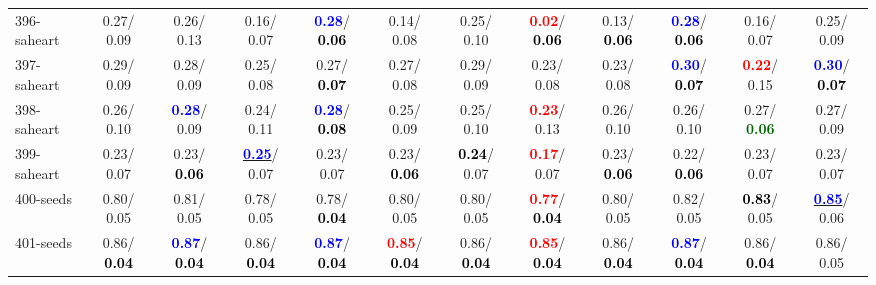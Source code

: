 \begin{table}[h]
\begin{center}
{\begin{tabular}{lc|c|c|c|c|c|c|c|c|c|c}
396-saheart &   0.27/  0.09 &   0.26/  0.13 &   0.16/  0.07 & \textcolor{blue}{\textbf{  0.28}}/\textcolor{black}{\textbf{  0.06}} &   0.14/  0.08 &   0.25/  0.10 & \textcolor{red}{\textbf{  0.02}}/\textcolor{black}{\textbf{  0.06}} &   0.13/\textcolor{black}{\textbf{  0.06}} & \textcolor{blue}{\textbf{  0.28}}/\textcolor{black}{\textbf{  0.06}} &   0.16/  0.07 &   0.25/  0.09 \\
397-saheart &   0.29/  0.09 &   0.28/  0.09 &   0.25/  0.08 &   0.27/\textcolor{black}{\textbf{  0.07}} &   0.27/  0.08 &   0.29/  0.09 &   0.23/  0.08 &   0.23/  0.08 & \textcolor{blue}{\textbf{  0.30}}/\textcolor{black}{\textbf{  0.07}} & \textcolor{red}{\textbf{  0.22}}/  0.15 & \textcolor{blue}{\textbf{  0.30}}/\textcolor{black}{\textbf{  0.07}} \\
398-saheart &   0.26/  0.10 & \textcolor{blue}{\textbf{  0.28}}/  0.09 &   0.24/  0.11 & \textcolor{blue}{\textbf{  0.28}}/\textcolor{black}{\textbf{  0.08}} &   0.25/  0.09 &   0.25/  0.10 & \textcolor{red}{\textbf{  0.23}}/  0.13 &   0.26/  0.10 &   0.26/  0.10 &   0.27/\textcolor{darkgreen}{\textbf{  0.06}} &   0.27/  0.09 \\ \hline
399-saheart &   0.23/  0.07 &   0.23/\textcolor{black}{\textbf{  0.06}} & \underline{\textcolor{blue}{\textbf{  0.25}}}/  0.07 &   0.23/  0.07 &   0.23/\textcolor{black}{\textbf{  0.06}} & \textcolor{black}{\textbf{  0.24}}/  0.07 & \textcolor{red}{\textbf{  0.17}}/  0.07 &   0.23/\textcolor{black}{\textbf{  0.06}} &   0.22/\textcolor{black}{\textbf{  0.06}} &   0.23/  0.07 &   0.23/  0.07 \\
400-seeds &   0.80/  0.05 &   0.81/  0.05 &   0.78/  0.05 &   0.78/\textcolor{black}{\textbf{  0.04}} &   0.80/  0.05 &   0.80/  0.05 & \textcolor{red}{\textbf{  0.77}}/\textcolor{black}{\textbf{  0.04}} &   0.80/  0.05 &   0.82/  0.05 & \textcolor{black}{\textbf{  0.83}}/  0.05 & \underline{\textcolor{blue}{\textbf{  0.85}}}/  0.06 \\
401-seeds &   0.86/\textcolor{black}{\textbf{  0.04}} & \textcolor{blue}{\textbf{  0.87}}/\textcolor{black}{\textbf{  0.04}} &   0.86/\textcolor{black}{\textbf{  0.04}} & \textcolor{blue}{\textbf{  0.87}}/\textcolor{black}{\textbf{  0.04}} & \textcolor{red}{\textbf{  0.85}}/\textcolor{black}{\textbf{  0.04}} &   0.86/\textcolor{black}{\textbf{  0.04}} & \textcolor{red}{\textbf{  0.85}}/\textcolor{black}{\textbf{  0.04}} &   0.86/\textcolor{black}{\textbf{  0.04}} & \textcolor{blue}{\textbf{  0.87}}/\textcolor{black}{\textbf{  0.04}} &   0.86/\textcolor{black}{\textbf{  0.04}} &   0.86/  0.05 \\

\end{tabular}}
\end{center}
\end{table}
